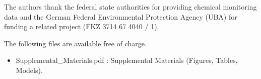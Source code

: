 \documentclass[journal=esthag,manuscript=article]{achemso}
\begin{document}
\begin{acknowledgement}
The authors thank the federal state authorities for providing chemical monitoring data and the German Federal Environmental Protection Agency (UBA) for funding a related project (FKZ 3714 67 4040 / 1). 
\end{acknowledgement}



\begin{suppinfo}
The following files are available free of charge.
\begin{itemize}
  \item Supplemental\_Materials.pdf : Supplemental Materials (Figures, Tables, Models).
\end{itemize}
\end{suppinfo}



\end{document}
